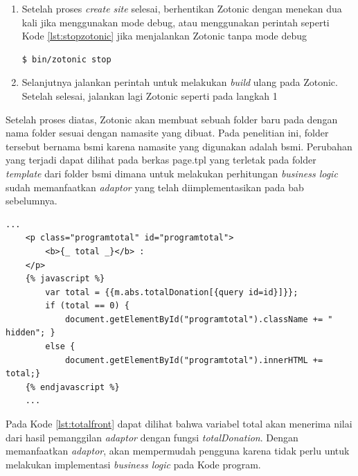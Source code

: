 \begin{enumerate}
	\item Setelah proses \textit{create site} selesai, berhentikan Zotonic dengan menekan  dua kali jika menggunakan mode debug, atau menggunakan perintah seperti Kode \ref{lst:stopzotonic} jika menjalankan Zotonic tanpa mode debug
	\begin{minipage}{\linewidth}
		\begin{lstlisting}[caption={Perintah untuk memberhentikan Zotonic},label={lst:stopzotonic}]
		$ bin/zotonic stop
		\end{lstlisting}
	\end{minipage}

	\item Selanjutnya jalankan perintah  untuk melakukan \textit{build} ulang pada Zotonic. Setelah selesai, jalankan lagi Zotonic seperti pada langkah 1
	
\end{enumerate}

Setelah proses diatas, Zotonic akan membuat sebuah folder baru pada  dengan nama folder sesuai dengan namasite yang dibuat. Pada penelitian ini, folder tersebut bernama bsmi karena namasite yang digunakan adalah bsmi. Perubahan yang terjadi dapat dilihat pada berkas page.tpl yang terletak pada folder \textit{template} dari folder bsmi dimana untuk melakukan perhitungan \textit{business logic} sudah memanfaatkan \textit{adaptor} yang telah diimplementasikan pada bab sebelumnya.
\begin{minipage}{\linewidth}
	\begin{lstlisting}[caption={\textit{Business logic} untuk fungsi total pada kategori program},label={lst:totalfront}]
	...
	<p class="programtotal" id="programtotal">
		<b>{_ total _}</b> : 
	</p>
	{% javascript %} 
		var total = {{m.abs.totalDonation[{query id=id}]}}; 
		if (total == 0) {
			document.getElementById("programtotal").className += " hidden"; } 
		else { 
			document.getElementById("programtotal").innerHTML += total;}
	{% endjavascript %}
	...
	\end{lstlisting}
\end{minipage}

Pada Kode \ref{lst:totalfront} dapat dilihat bahwa variabel total akan menerima nilai dari hasil pemanggilan \textit{adaptor} dengan fungsi \textit{totalDonation}. Dengan memanfaatkan \textit{adaptor}, akan mempermudah pengguna karena tidak perlu untuk melakukan implementasi \textit{business logic} pada Kode program.
